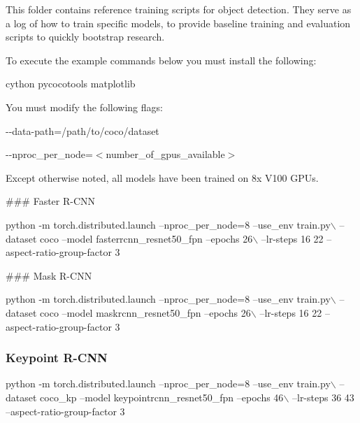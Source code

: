 This folder contains reference training scripts for object detection. They serve as a log of how to train specific models, to provide baseline training and evaluation scripts to quickly bootstrap research.

To execute the example commands below you must install the following\+:


\begin{DoxyCode}
cython
pycocotools
matplotlib
\end{DoxyCode}


You must modify the following flags\+:

{\ttfamily -\/-\/data-\/path=/path/to/coco/dataset}

{\ttfamily -\/-\/nproc\+\_\+per\+\_\+node=$<$number\+\_\+of\+\_\+gpus\+\_\+available$>$}

Except otherwise noted, all models have been trained on 8x V100 G\+P\+Us.

\#\#\# Faster R-\/\+C\+NN 
\begin{DoxyCode}
python -m torch.distributed.launch --nproc\_per\_node=8 --use\_env train.py\(\backslash\)
    --dataset coco --model fasterrcnn\_resnet50\_fpn --epochs 26\(\backslash\)
    --lr-steps 16 22 --aspect-ratio-group-factor 3
\end{DoxyCode}


\#\#\# Mask R-\/\+C\+NN 
\begin{DoxyCode}
python -m torch.distributed.launch --nproc\_per\_node=8 --use\_env train.py\(\backslash\)
    --dataset coco --model maskrcnn\_resnet50\_fpn --epochs 26\(\backslash\)
    --lr-steps 16 22 --aspect-ratio-group-factor 3
\end{DoxyCode}


\subsubsection*{Keypoint R-\/\+C\+NN}


\begin{DoxyCode}
python -m torch.distributed.launch --nproc\_per\_node=8 --use\_env train.py\(\backslash\)
    --dataset coco\_kp --model keypointrcnn\_resnet50\_fpn --epochs 46\(\backslash\)
    --lr-steps 36 43 --aspect-ratio-group-factor 3
\end{DoxyCode}
 